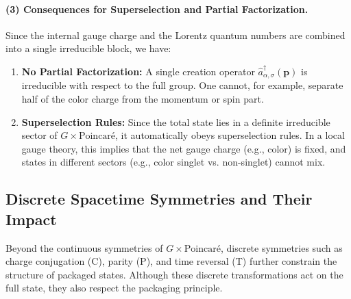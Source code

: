 \documentclass[12pt,a4paper]{article}
\begin{document}
\paragraph{(3) Consequences for Superselection and Partial Factorization.}
Since the internal gauge charge and the Lorentz quantum numbers are combined into a single irreducible block, we have:
\begin{enumerate}
	\item \textbf{No Partial Factorization:}  
	A single creation operator $\hat{a}^\dagger_{\alpha,\sigma}(\mathbf{p})$ is irreducible with respect to the full group.
	One cannot, for example, separate half of the color charge from the momentum or spin part.
	
	\item \textbf{Superselection Rules:}  
	Since the total state lies in a definite irreducible sector of $G \times \mathrm{Poincaré}$, it automatically obeys superselection rules.
	In a local gauge theory, this implies that the net gauge charge (e.g., color) is fixed, and states in different sectors (e.g., color singlet vs. non-singlet) cannot mix.
\end{enumerate}



\subsection{Discrete Spacetime Symmetries and Their Impact}

Beyond the continuous symmetries of $G \times \mathrm{Poincaré}$, discrete symmetries such as charge conjugation (C), parity (P), and time reversal (T) further constrain the structure of packaged states.
Although these discrete transformations act on the full state, they also respect the packaging principle.
\end{document}
